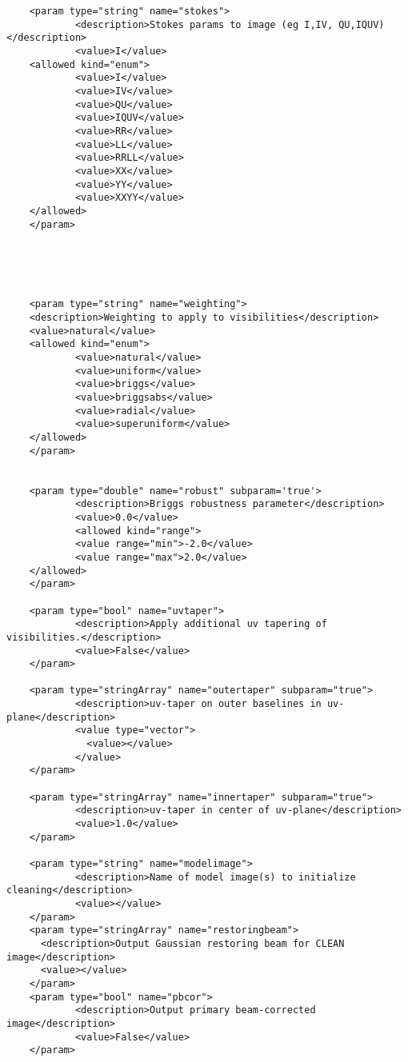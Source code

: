 \begin{verbatim}
    <param type="string" name="stokes">
            <description>Stokes params to image (eg I,IV, QU,IQUV)</description>
            <value>I</value>
    <allowed kind="enum">
            <value>I</value>
            <value>IV</value>
            <value>QU</value>
            <value>IQUV</value>
            <value>RR</value>
            <value>LL</value>
            <value>RRLL</value>
            <value>XX</value>
            <value>YY</value>
            <value>XXYY</value>
    </allowed>
    </param>

    

    

    <param type="string" name="weighting">
    <description>Weighting to apply to visibilities</description>
    <value>natural</value>
    <allowed kind="enum">
            <value>natural</value>
            <value>uniform</value>
            <value>briggs</value>
            <value>briggsabs</value>
            <value>radial</value>
            <value>superuniform</value>
    </allowed>
    </param>


    <param type="double" name="robust" subparam='true'>
            <description>Briggs robustness parameter</description>
            <value>0.0</value>
            <allowed kind="range">
            <value range="min">-2.0</value>
            <value range="max">2.0</value>
    </allowed>
    </param>

    <param type="bool" name="uvtaper">
            <description>Apply additional uv tapering of  visibilities.</description>
            <value>False</value>
    </param>

    <param type="stringArray" name="outertaper" subparam="true">
            <description>uv-taper on outer baselines in uv-plane</description>
            <value type="vector">
              <value></value>
            </value>
    </param>

    <param type="stringArray" name="innertaper" subparam="true">
            <description>uv-taper in center of uv-plane</description>
            <value>1.0</value>
    </param>

    <param type="string" name="modelimage">
            <description>Name of model image(s) to initialize cleaning</description>
            <value></value>
    </param>
    <param type="stringArray" name="restoringbeam">
      <description>Output Gaussian restoring beam for CLEAN image</description>
      <value></value>
    </param>
    <param type="bool" name="pbcor">
            <description>Output primary beam-corrected image</description>
            <value>False</value>
    </param>


\end{verbatim}
